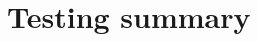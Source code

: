 \documentclass[../../report.tex]{subfiles}
\begin{document}
\chapter{Testing summary}
\end{document}
